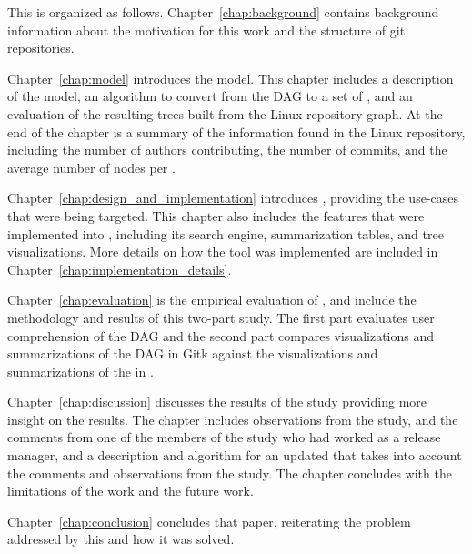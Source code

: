 This \paper{} is organized as follows.
Chapter~\ref{chap:background} contains background information about the
motivation for this work and the structure of git repositories.

Chapter~\ref{chap:model} introduces the \mt{} model.
This chapter includes a description of the model, an algorithm to
convert from the DAG to a set of , and an evaluation of the
resulting trees built from the Linux repository graph.
At the end of the chapter is a summary of the information found in the
Linux repository, including the number of authors contributing, the
number of commits, and the average number of nodes per \mt{}.

Chapter~\ref{chap:design_and_implementation} introduces \tool{},
providing the use-cases that were being targeted.
This chapter also includes the features that were implemented into \tool{},
including its search engine, summarization tables, and tree visualizations.
More details on how the tool was implemented are included in
Chapter~\ref{chap:implementation_details}.

Chapter~\ref{chap:evaluation} is the empirical evaluation of \tool{},
and include the methodology and results of this two-part study. The
first part evaluates user comprehension of the DAG and the second part
compares visualizations and summarizations of the DAG in Gitk against
the visualizations and summarizations of the \mt{} in \tool{}.

Chapter~\ref{chap:discussion} discusses the results of the study
providing more insight on the results. The chapter includes observations
from the study, and the comments from one of the members of the study
who had worked as a release manager, and a description and algorithm for
an updated \mt{} that takes into account the comments and observations
from the study. The chapter concludes with the limitations of the work
and the future work.

Chapter~\ref{chap:conclusion} concludes that paper, reiterating the
problem addressed by this \paper{} and how it was solved.

